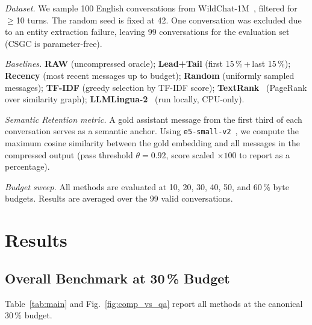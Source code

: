 \documentclass[conference]{IEEEtran}
\newcommand{\csgc}{\textsc{CSGC}}
\begin{document}
\textit{Dataset.}
We sample 100 English conversations from WildChat-1M~\cite{zhao2024wildchat},
filtered for $\geq$10 turns. The random seed is fixed at 42. One conversation
was excluded due to an entity extraction failure, leaving 99 conversations for
the evaluation set (\csgc{} is parameter-free).

\textit{Baselines.}
\textbf{RAW} (uncompressed oracle);
\textbf{Lead+Tail} (first 15\,\%\,+\,last 15\,\%);
\textbf{Recency} (most recent messages up to budget);
\textbf{Random} (uniformly sampled messages);
\textbf{TF-IDF} (greedy selection by TF-IDF score);
\textbf{TextRank}~\cite{mihalcea2004textrank} (PageRank over similarity graph);
\textbf{LLMLingua-2}~\cite{pan2024llmlingua2} (run locally, CPU-only).

\textit{Semantic Retention metric.}
A gold assistant message from the first third of each conversation serves as a
semantic anchor. Using \texttt{e5-small-v2}~\cite{wang2024e5}, we compute the
maximum cosine similarity between the gold embedding and all messages in the
compressed output (pass threshold $\theta = 0.92$, score scaled $\times 100$
to report as a percentage).

\textit{Budget sweep.}
All methods are evaluated at 10, 20, 30, 40, 50, and 60\,\% byte budgets.
Results are averaged over the 99 valid conversations.

\section{Results}
\label{sec:results}

\subsection{Overall Benchmark at 30\,\% Budget}

Table~\ref{tab:main} and Fig.~\ref{fig:comp_vs_qa} report all methods at
the canonical 30\,\% budget.
\end{document}
